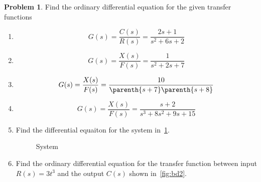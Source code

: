 \documentclass[10pt]{article}
\theoremstyle{definition}
\newtheorem{prob}{Problem}[section]
\newenvironment{subprob}%
{\renewcommand{\theenumi}{\alph{enumi}}\renewcommand{\labelenumi}{(\theenumi)}\begin{enumerate}}%
{\end{enumerate}}%
\begin{document}
\begin{prob}
    Find the ordinary differential equation for the given transfer functions
    \begin{subprob}
    \item \[ G(s) = \frac{C(s)}{R(s)} = \frac{2 s + 1}{s^2 + 6s + 2} \]
    \item \[ G(s) = \frac{X(s)}{F(s)} = \frac{1}{s^2 + 2s+7} \]
    \item \[ G(s) = \frac{X(s)}{F(s)} = \frac{10}{\parenth{s+7}\parenth{s+8}}\]
    \item \[ G(s) = \frac{X(s)}{F(s)} = \frac{s+2}{s^3 + 8s^2 + 9s+15}\]
    \item Find the differential equaiton for the system in~\cref{fig:blockdiagram}.
    \begin{figure}[h]
        \centering
            \caption{System~\label{fig:blockdiagram}}
        \end{figure}

    \item Find the ordinary differential equation for the transfer function between input \( R(s) = 3 t^3 \) and the output \( C(s)\) shown in~\cref{fig:bd2}.
    \begin{figure}[h]
        \centering
        \begin{scaletikzpicturetowidth}{2\textwidth}
\end{scaletikzpicturetowidth}
\end{figure}
\end{subprob}
\end{prob}
\end{document}

